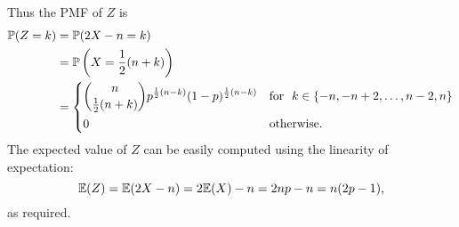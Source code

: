 \begin{exercise}
\begin{questions}
\begin{answer}
Thus the PMF of $Z$ is
\begin{align*}
\mathbb{P}(Z=k) 
	& = \mathbb{P}(2X-n=k) \\
	& = \mathbb{P}\left(X = \frac{1}{2}(n+k)\right) \\
	& = \begin{cases}
	\displaystyle\binom{n}{\frac{1}{2}(n+k)} p^{\frac{1}{2}(n-k)}(1-p)^{\frac{1}{2}(n-k)}	&\text{for}\ \ k\in \{-n,-n+2,\ldots,n-2,n\} \\[2ex]
	0	& \text{otherwise.}
\end{cases}	
\end{align*}
The expected value of $Z$ can be easily computed using the linearity of expectation:
\[
\mathbb{E}(Z) = \mathbb{E}(2X-n) = 2\mathbb{E}(X)-n = 2np - n = n(2p-1),
\]	
as required. 
\end{answer}

\end{questions}
\end{exercise}
\endinput

